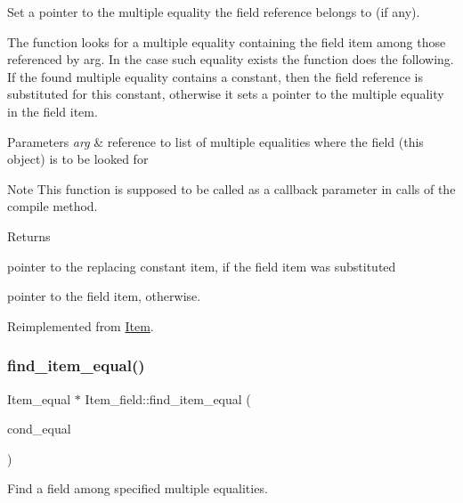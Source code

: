 Set a pointer to the multiple equality the field reference belongs to (if any).

The function looks for a multiple equality containing the field item among those referenced by arg. In the case such equality exists the function does the following. If the found multiple equality contains a constant, then the field reference is substituted for this constant, otherwise it sets a pointer to the multiple equality in the field item.


\begin{DoxyParams}{Parameters}
{\em arg} & reference to list of multiple equalities where the field (this object) is to be looked for\\
\hline
\end{DoxyParams}
\begin{DoxyNote}{Note}
This function is supposed to be called as a callback parameter in calls of the compile method.
\end{DoxyNote}
\begin{DoxyReturn}{Returns}

\begin{DoxyItemize}
\item pointer to the replacing constant item, if the field item was substituted
\item pointer to the field item, otherwise. 
\end{DoxyItemize}
\end{DoxyReturn}


Reimplemented from \mbox{\hyperlink{classItem}{Item}}.

\mbox{\label{classItem__field_ae8d49460f4a67ebb4e116418219581fc}} 
\subsubsection{\texorpdfstring{find\+\_\+item\+\_\+equal()}{find\_item\_equal()}}
{\footnotesize\ttfamily Item\+\_\+equal $\ast$ Item\+\_\+field\+::find\+\_\+item\+\_\+equal (\begin{DoxyParamCaption}\item[{C\+O\+N\+D\+\_\+\+E\+Q\+U\+AL $\ast$}]{cond\+\_\+equal }\end{DoxyParamCaption})}

Find a field among specified multiple equalities.

